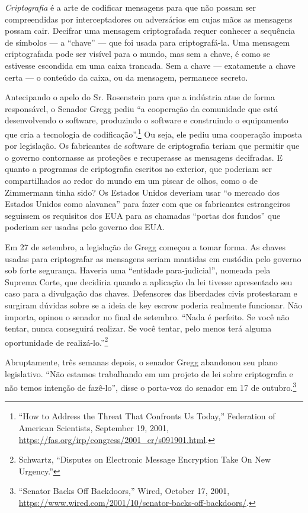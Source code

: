 \documentclass{book}
\newcommand{\ingles}[1]{\textit{#1}}
\begin{document}
\ingles{Criptografia} é a arte de codificar mensagens para que não possam ser compreendidas por interceptadores ou adversários em cujas mãos as mensagens possam cair. Decifrar uma mensagem criptografada requer conhecer a sequência de símbolos --- a ``chave'' --- que foi usada para criptografá-la. Uma mensagem criptografada pode ser visível para o mundo, mas sem a chave, é como se estivesse escondida em uma caixa trancada. Sem a chave --- exatamente a chave certa --- o conteúdo da caixa, ou da mensagem, permanece secreto.

Antecipando o apelo do Sr. Rosenstein para que a indústria atue de forma responsável, o Senador Gregg pediu ``a cooperação da comunidade que está desenvolvendo o software, produzindo o software e construindo o equipamento que cria a tecnologia de codificação''.\footnote{“How to Address the Threat That Confronts Us Today,” Federation of American Scientists, September 19, 2001, \url{https://fas.org/irp/congress/2001_cr/s091901.html}.} Ou seja, ele pediu uma cooperação imposta por legislação. Os fabricantes de software de criptografia teriam que permitir que o governo contornasse as proteções e recuperasse as mensagens decifradas. E quanto a programas de criptografia escritos no exterior, que poderiam ser compartilhados ao redor do mundo em um piscar de olhos, como o de Zimmermann tinha sido? Os Estados Unidos deveriam usar ``o mercado dos Estados Unidos como alavanca'' para fazer com que os fabricantes estrangeiros seguissem os requisitos dos EUA para as chamadas ``portas dos fundos'' que poderiam ser usadas pelo governo dos EUA.

Em 27 de setembro, a legislação de Gregg começou a tomar forma. As chaves usadas para criptografar as mensagens seriam mantidas em custódia pelo governo sob forte segurança. Haveria uma ``entidade para-judicial'', nomeada pela Suprema Corte, que decidiria quando a aplicação da lei tivesse apresentado seu caso para a divulgação das chaves. Defensores das liberdades civis protestaram e surgiram dúvidas sobre se a ideia de key escrow poderia realmente funcionar. Não importa, opinou o senador no final de setembro. ``Nada é perfeito. Se você não tentar, nunca conseguirá realizar. Se você tentar, pelo menos terá alguma oportunidade de realizá-lo.''\footnote{Schwartz, “Disputes on Electronic Message Encryption Take On New Urgency.”}

Abruptamente, três semanas depois, o senador Gregg abandonou seu plano legislativo. ``Não estamos trabalhando em um projeto de lei sobre criptografia e não temos intenção de fazê-lo'', disse o porta-voz do senador em 17 de outubro.\footnote{“Senator Backs Off Backdoors,” Wired, October 17, 2001, \url{https://www.wired.com/2001/10/senator‐backs‐off‐backdoors/}.}
\end{document}
